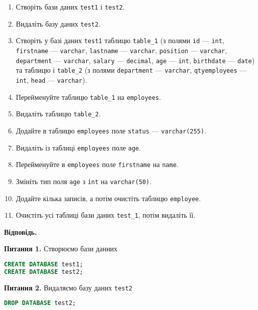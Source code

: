 \documentclass{hw_template}
\begin{document}
\begin{problem}
    \begin{enumerate}
        \item Створіть бази даних \texttt{test1} і \texttt{test2}.
        \item Видаліть базу даних \texttt{test2}.
        \item Створіть у базі даних \texttt{test1} таблицю \texttt{table\_1} (з
        полями \texttt{id} --- \texttt{int}, \texttt{firstname} --- \texttt{varchar},
        \texttt{lastname} --- \texttt{varchar}, \texttt{position} --- \texttt{varchar},
        \texttt{department} --- \texttt{varchar}, \texttt{salary} --- \texttt{decimal},
        \texttt{age} --- \texttt{int}, \texttt{birthdate} --- \texttt{date}) та
        таблицю і \texttt{table\_2} (з полями
        \texttt{department} --- \texttt{varchar},
        \texttt{qtyemployees} --- \texttt{int}, \texttt{head} --- \texttt{varchar}).
        \item Перейменуйте таблицю \texttt{table\_1} на \texttt{employees}.
        \item Видаліть таблицю \texttt{table\_2}.
        \item Додайте в таблицю \texttt{employees} поле \texttt{status} ---
        \texttt{varchar(255)}.
        \item Видаліть із таблиці \texttt{employees} поле \texttt{age}.
        \item Перейменуйте в \texttt{employees} поле \texttt{firstname} на \texttt{name}.
        \item Змініть тип поля \texttt{age} з \texttt{int} на \texttt{varchar(50)}.
        \item Додайте кілька записів, а потім очистіть таблицю \texttt{employee}.
        \item Очистіть усі таблиці бази даних \texttt{test\_1}, потім видаліть її.
    \end{enumerate}
\end{problem}

\textbf{Відповідь.}

\textbf{Питання 1.} Створюємо бази данних
\begin{lstlisting}[language=SQL]
CREATE DATABASE test1;
CREATE DATABASE test2;
\end{lstlisting}

\textbf{Питання 2.} Видаляємо базу даних \texttt{test2}
\begin{lstlisting}[language=SQL]
DROP DATABASE test2;
\end{lstlisting}
\end{document}

